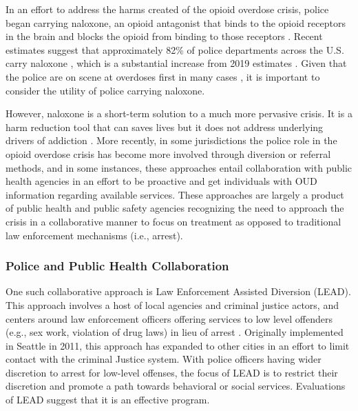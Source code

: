 In an effort to address the harms created of the opioid overdose crisis, police began carrying naloxone, an opioid antagonist that binds to the opioid receptors in the brain and blocks the opioid from binding to those receptors \parencite{lurigio_opioid_2018}. Recent estimates suggest that approximately 82\% of police departments across the U.S. carry naloxone \parencite{ray_national_2023}, which is a substantial increase from 2019 estimates \parencite{quinn_most_2019}. Given that the police are on scene at overdoses first in many cases \parencite{beletsky_police_2011, silverman_harmonizing_2012, white_leveraging_2022}, it is important to consider the utility of police carrying naloxone. 

However, naloxone is a short-term solution to a much more pervasive crisis. It is a harm reduction tool that can saves lives but it does not address underlying drivers of addiction \parencite{goodison_law_2019,  rando_intranasal_2015, rees_little_2019}. More recently, in some jurisdictions the police role in the opioid overdose crisis has become more involved through diversion or referral methods, and in some instances, these approaches entail collaboration with public health agencies in an effort to be proactive and get individuals with OUD information regarding available services. These approaches are largely a product of public health and public safety agencies recognizing the need to approach the crisis in a collaborative manner to focus on treatment as opposed to traditional law enforcement mechanisms (i.e., arrest).

\subsubsection{Police and Public Health Collaboration}

One such collaborative approach is Law Enforcement Assisted Diversion (LEAD). This approach involves a host of local agencies and criminal justice actors, and centers around law enforcement officers offering services to low level offenders (e.g., sex work, violation of drug laws) in lieu of arrest \parencite{national_institute_of_justice_program_2016}. Originally implemented in Seattle in 2011, this approach has expanded to other cities in an effort to limit contact with the criminal Justice system. With police officers having wider discretion to arrest for low-level offenses, the focus of LEAD is to restrict their discretion and promote a path towards behavioral or social services. Evaluations of LEAD suggest that it is an effective program.


